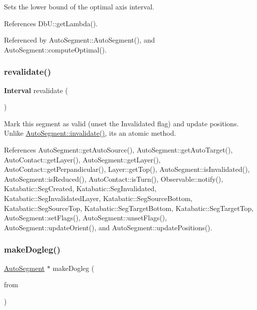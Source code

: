Sets the lower bound of the optimal axis interval. 

References Db\+U\+::get\+Lambda().



Referenced by Auto\+Segment\+::\+Auto\+Segment(), and Auto\+Segment\+::compute\+Optimal().

\mbox{\label{classKatabatic_1_1AutoSegment_a88ac40c065bce0ff97792d18b41b6a67}} 
\subsubsection{\texorpdfstring{revalidate()}{revalidate()}}
{\footnotesize\ttfamily \textbf{ Interval} revalidate (\begin{DoxyParamCaption}{ }\end{DoxyParamCaption})}

Mark this segment as valid (unset the Invalidated flag) and update positions. Unlike \hyperlink{classKatabatic_1_1AutoSegment_a23599eee5a07af377fbc8d47cda7e7b0}{Auto\+Segment\+::invalidate()}, it\textquotesingle{}s an atomic method. 

References Auto\+Segment\+::get\+Auto\+Source(), Auto\+Segment\+::get\+Auto\+Target(), Auto\+Contact\+::get\+Layer(), Auto\+Segment\+::get\+Layer(), Auto\+Contact\+::get\+Perpandicular(), Layer\+::get\+Top(), Auto\+Segment\+::is\+Invalidated(), Auto\+Segment\+::is\+Reduced(), Auto\+Contact\+::is\+Turn(), Observable\+::notify(), Katabatic\+::\+Seg\+Created, Katabatic\+::\+Seg\+Invalidated, Katabatic\+::\+Seg\+Invalidated\+Layer, Katabatic\+::\+Seg\+Source\+Bottom, Katabatic\+::\+Seg\+Source\+Top, Katabatic\+::\+Seg\+Target\+Bottom, Katabatic\+::\+Seg\+Target\+Top, Auto\+Segment\+::set\+Flags(), Auto\+Segment\+::unset\+Flags(), Auto\+Segment\+::update\+Orient(), and Auto\+Segment\+::update\+Positions().

\mbox{\label{classKatabatic_1_1AutoSegment_a39c927c04b5016770692b9b8448c2f04}} 
\subsubsection{\texorpdfstring{make\+Dogleg()}{makeDogleg()}\hspace{0.1cm}{\footnotesize\ttfamily [1/3]}}
{\footnotesize\ttfamily \hyperlink{classKatabatic_1_1AutoSegment}{Auto\+Segment} $\ast$ make\+Dogleg (\begin{DoxyParamCaption}\item[{\hyperlink{classKatabatic_1_1AutoContact}{Auto\+Contact} $\ast$}]{from }\end{DoxyParamCaption})}



